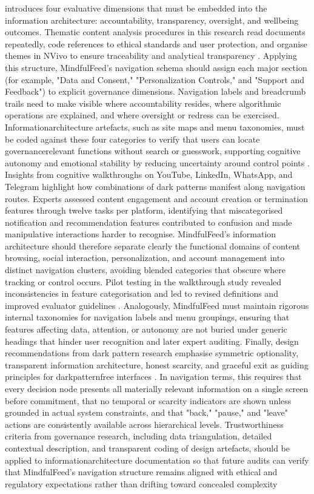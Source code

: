 \documentclass{article}
\begin{document}
introduces four evaluative dimensions that must be embedded into the information architecture: accountability, transparency, oversight, and well\-being outcomes. Thematic content analysis procedures in this research read documents repeatedly, code references to ethical standards and user protection, and organise themes in NVivo to ensure traceability and analytical transparency \parencites[8]{7808872}. Applying this structure, MindfulFeed's navigation schema should assign each major section (for example, "Data and Consent," "Personalization Controls," and "Support and Feedback") to explicit governance dimensions. Navigation labels and breadcrumb trails need to make visible where accountability resides, where algorithmic operations are explained, and where oversight or redress can be exercised. Information\-architecture artefacts, such as site maps and menu taxonomies, must be coded against these four categories to verify that users can locate governance\-relevant functions without search or guesswork, supporting cognitive autonomy and emotional stability by reducing uncertainty around control points \parencites[3]{7808872}[8]{7808872}. Insights from cognitive walkthroughs on YouTube, LinkedIn, WhatsApp, and Telegram highlight how combinations of dark patterns manifest along navigation routes. Experts assessed content engagement and account creation or termination features through twelve tasks per platform, identifying that miscategorised notification and recommendation features contributed to confusion and made manipulative interactions harder to recognise. MindfulFeed's information architecture should therefore separate clearly the functional domains of content browsing, social interaction, personalization, and account management into distinct navigation clusters, avoiding blended categories that obscure where tracking or control occurs. Pilot testing in the walkthrough study revealed inconsistencies in feature categorisation and led to revised definitions and improved evaluator guidelines \parencites[3]{4692551}. Analogously, MindfulFeed must maintain rigorous internal taxonomies for navigation labels and menu groupings, ensuring that features affecting data, attention, or autonomy are not buried under generic headings that hinder user recognition and later expert auditing. Finally, design recommendations from dark pattern research emphasise symmetric optionality, transparent information architecture, honest scarcity, and graceful exit as guiding principles for dark\-pattern\-free interfaces \parencites[6]{4807303}. In navigation terms, this requires that every decision node presents all materially relevant information on a single screen before commitment, that no temporal or scarcity indicators are shown unless grounded in actual system constraints, and that "back," "pause," and "leave" actions are consistently available across hierarchical levels. Trustworthiness criteria from governance research, including data triangulation, detailed contextual description, and transparent coding of design artefacts, should be applied to information\-architecture documentation so that future audits can verify that MindfulFeed's navigation structure remains aligned with ethical and regulatory expectations rather than drifting toward concealed complexity 
\end{document}

